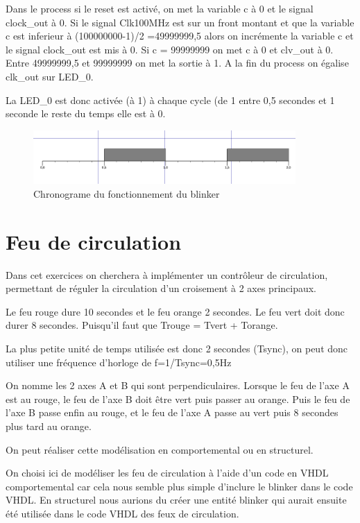 \documentclass[11pt]{report}
\begin{document}
Dans le process si le reset est activé, on met la variable c à 0 et le signal clock\_out à 0. Si le signal Clk100MHz est sur un front montant et que la variable c est inferieur à (100000000-1)/2 =49999999,5 alors on incrémente la variable c et le signal clock\_out est mis à 0. Si c = 99999999 on met c à 0 et clv\_out à 0. Entre 49999999,5 et 99999999 on met la sortie à 1.
A la fin du process on égalise clk\_out sur LED\_0.

La LED\_0 est donc activée (à 1) à chaque cycle (de 1 entre 0,5 secondes et 1 seconde le reste du temps elle est à 0.

\begin{figure}[h]
\includegraphics[width=10cm]{TP03-1.PNG}
\caption{Chronograme du fonctionnement du blinker}
\end{figure}


\section{Feu de circulation}

Dans cet exercices on cherchera à implémenter un contrôleur de circulation, permettant de réguler la circulation d'un croisement à 2 axes principaux.

Le feu rouge dure 10 secondes et le feu orange 2 secondes. Le feu vert doit donc durer 8 secondes. Puisqu'il faut que Trouge = Tvert + Torange.

La plus petite unité de temps utilisée est donc 2 secondes (Tsync), on  peut donc utiliser une fréquence d'horloge de f=1/Tsync=0,5Hz

On nomme les 2 axes A et B qui sont perpendiculaires. Lorsque le feu de l'axe A est au rouge, le feu de l'axe B doit être vert puis passer au orange. Puis le feu de l'axe B passe enfin au rouge, et le feu de l'axe A passe au vert puis 8 secondes plus tard au orange.

On peut réaliser cette modélisation en comportemental ou en structurel.

On choisi ici de modéliser les feu de circulation à l'aide d'un code en VHDL comportemental car cela nous semble plus simple d'inclure le blinker dans le code VHDL. En structurel nous aurions du créer une entité blinker qui aurait ensuite été utilisée dans le code VHDL des feux de circulation.
\end{document}

